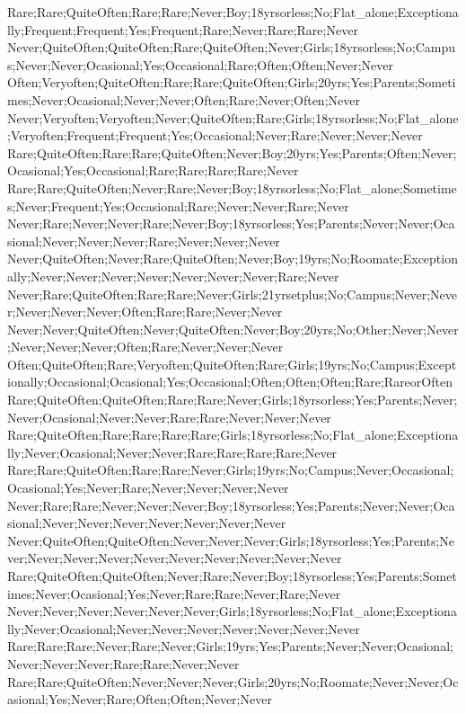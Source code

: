 Rare;Rare;QuiteOften;Rare;Rare;Never;Boy;18yrsorless;No;Flat_alone;Exceptionally;Frequent;Frequent;Yes;Frequent;Rare;Never;Rare;Rare;Never
Never;QuiteOften;QuiteOften;Rare;QuiteOften;Never;Girls;18yrsorless;No;Campus;Never;Never;Ocasional;Yes;Occasional;Rare;Often;Often;Never;Never
Often;Veryoften;QuiteOften;Rare;Rare;QuiteOften;Girls;20yrs;Yes;Parents;Sometimes;Never;Ocasional;Never;Never;Often;Rare;Never;Often;Never
Never;Veryoften;Veryoften;Never;QuiteOften;Rare;Girls;18yrsorless;No;Flat_alone;Veryoften;Frequent;Frequent;Yes;Occasional;Never;Rare;Never;Never;Never
Rare;QuiteOften;Rare;Rare;QuiteOften;Never;Boy;20yrs;Yes;Parents;Often;Never;Ocasional;Yes;Occasional;Rare;Rare;Rare;Rare;Never
Rare;Rare;QuiteOften;Never;Rare;Never;Boy;18yrsorless;No;Flat_alone;Sometimes;Never;Frequent;Yes;Occasional;Rare;Never;Never;Rare;Never
Never;Rare;Never;Never;Rare;Never;Boy;18yrsorless;Yes;Parents;Never;Never;Ocasional;Never;Never;Never;Rare;Never;Never;Never
Never;QuiteOften;Never;Rare;QuiteOften;Never;Boy;19yrs;No;Roomate;Exceptionally;Never;Never;Never;Never;Never;Never;Never;Rare;Never
Never;Rare;QuiteOften;Rare;Rare;Never;Girls;21yrsetplus;No;Campus;Never;Never;Never;Never;Never;Often;Rare;Rare;Never;Never
Never;Never;QuiteOften;Never;QuiteOften;Never;Boy;20yrs;No;Other;Never;Never;Never;Never;Never;Often;Rare;Never;Never;Never
Often;QuiteOften;Rare;Veryoften;QuiteOften;Rare;Girls;19yrs;No;Campus;Exceptionally;Occasional;Ocasional;Yes;Occasional;Often;Often;Often;Rare;RareorOften
Rare;QuiteOften;QuiteOften;Rare;Rare;Never;Girls;18yrsorless;Yes;Parents;Never;Never;Ocasional;Never;Never;Rare;Rare;Never;Never;Never
Rare;QuiteOften;Rare;Rare;Rare;Rare;Girls;18yrsorless;No;Flat_alone;Exceptionally;Never;Ocasional;Never;Never;Rare;Rare;Rare;Rare;Never
Rare;Rare;QuiteOften;Rare;Rare;Never;Girls;19yrs;No;Campus;Never;Occasional;Ocasional;Yes;Never;Rare;Never;Never;Never;Never
Never;Rare;Rare;Never;Never;Never;Boy;18yrsorless;Yes;Parents;Never;Never;Ocasional;Never;Never;Never;Never;Never;Never;Never
Never;QuiteOften;QuiteOften;Never;Never;Never;Girls;18yrsorless;Yes;Parents;Never;Never;Never;Never;Never;Never;Never;Never;Never;Never
Rare;QuiteOften;QuiteOften;Never;Rare;Never;Boy;18yrsorless;Yes;Parents;Sometimes;Never;Ocasional;Yes;Never;Rare;Rare;Never;Rare;Never
Never;Never;Never;Never;Never;Never;Girls;18yrsorless;No;Flat_alone;Exceptionally;Never;Ocasional;Never;Never;Never;Never;Never;Never;Never
Rare;Rare;Rare;Never;Rare;Never;Girls;19yrs;Yes;Parents;Never;Never;Ocasional;Never;Never;Never;Rare;Rare;Never;Never
Rare;Rare;QuiteOften;Never;Never;Never;Girls;20yrs;No;Roomate;Never;Never;Ocasional;Yes;Never;Rare;Often;Often;Never;Never
